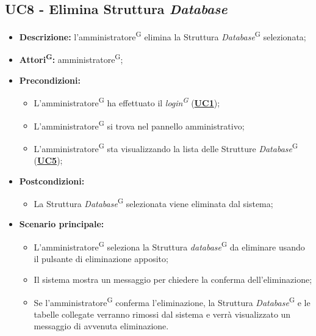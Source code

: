 \subsection{UC8 - Elimina Struttura \textit{Database}}
\label{sec:UC8}
\begin{itemize}
	\item \textbf{Descrizione:} l’amministratore\textsuperscript{G} elimina la Struttura \textit{Database}\textsuperscript{G} selezionata;
	\item \textbf{Attori\textsuperscript{G}:} amministratore\textsuperscript{G};
	\item \textbf{Precondizioni:} 
	\begin{itemize}
		\item L’amministratore\textsuperscript{G} ha effettuato il \textit{login\textsuperscript{G}} (\hyperref[sec:UC1]{\textbf{UC1}});
		\item L’amministratore\textsuperscript{G} si trova nel pannello amministrativo;
		\item L’amministratore\textsuperscript{G} sta visualizzando la lista delle Strutture \textit{Database}\textsuperscript{G} (\hyperref[sec:UC5]{\textbf{UC5}});
	\end{itemize}
	\item \textbf{Postcondizioni:} 
	\begin{itemize}
		\item La Struttura \textit{Database}\textsuperscript{G} selezionata viene eliminata dal sistema;
	\end{itemize}
	\item \textbf{Scenario principale:} 
	\begin{itemize}
		\item L'amministratore\textsuperscript{G} seleziona la Struttura \textit{database}\textsuperscript{G} da eliminare usando il pulsante di eliminazione apposito;
		\item Il sistema mostra un messaggio per chiedere la conferma dell'eliminazione;
		\item Se l'amministratore\textsuperscript{G} conferma l'eliminazione, la Struttura \textit{Database}\textsuperscript{G} e le tabelle collegate verranno rimossi dal sistema e verrà visualizzato un messaggio di avvenuta eliminazione.
	\end{itemize}
\end{itemize}

